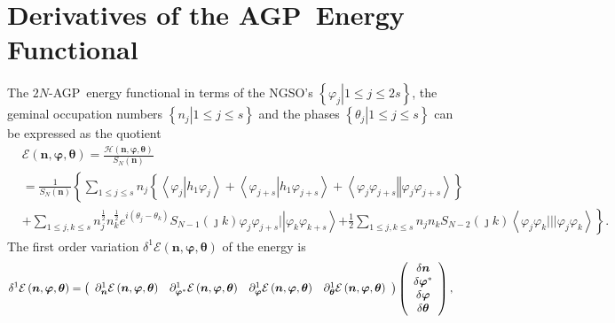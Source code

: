 \documentclass[aps,preprint]{revtex4}%
\begin{document}
\section{Derivatives of the AGP\ Energy Functional\label{variational}}

The $2N$-AGP\ energy functional in terms of the NGSO's $\left\{  \left.
\varphi_{j}\right\vert 1\leq j\leq2s\right\}  $, the geminal occupation
numbers $\left\{  \left.  n_{j}\right\vert 1\leq j\leq s\right\}  $ and the
phases $\left\{  \left.  \theta_{j}\right\vert 1\leq j\leq s\right\}  $ can be
expressed as the quotient%
\begin{align}
&  \mathcal{E}\left(  \bm{n},\bm{\varphi},\bm{\theta}\right)  =\frac
{\mathcal{H}\left(  \bm{n},\bm{\varphi},\bm{\theta}\right)  }{S_{N}\left(
\bm{n}\right)  }\nonumber\\
&  =\frac{1}{S_{N}\left(  \bm{n}\right)  }\left\{  \sum_{1\leq j\leq s}%
n_{j}\left\{  \left\langle \varphi_{j}\left\vert h_{1}\varphi_{j}\right.
\right\rangle +\left\langle \varphi_{j+s}\left\vert h_{1}\varphi_{j+s}\right.
\right\rangle +\left\langle \varphi_{j}\varphi_{j+s}\left\Vert \varphi
_{j}\varphi_{j+s}\right.  \right\rangle \right\}  \right. \nonumber\\
&  +\sum_{1\leq j,k\leq s}n_{j}^{\frac{1}{2}}n_{k}^{\frac{1}{2}}e^{i\left(
\theta_{j}-\theta_{k}\right)  }S_{N-1}\left(  \jmath k\right)  \varphi
_{j}\varphi_{j+s}|\left\vert \varphi_{k}\varphi_{k+s}\right\rangle \left.
+\frac{1}{2}\sum_{1\leq j,k\leq s}n_{j}n_{k}S_{N-2}\left(  \jmath k\right)
\left\langle \varphi_{j}\varphi_{k}|||\varphi_{j}\varphi_{k}\right\rangle
\right\}  .
\end{align}
The first order variation $\delta^{1}\mathcal{E}\left(
\bm{n},\bm{\varphi},\bm{\theta}\right)  $ of the energy is
\begin{equation}
\delta^{1}\mathcal{E}\left(  \bm{n},\bm{\varphi},\bm{\theta }\right)  =\left(
%
\begin{array}
[c]{cccc}%
\partial_{\bm{n}}^{1}\mathcal{E}\left(
\bm{n},\bm{\varphi },\bm{\theta}\right)  & \partial_{\bm{\varphi}^{\ast}}%
^{1}\mathcal{E}\left(  \bm{n},\bm{\varphi},\bm{\theta}\right)  &
\partial_{\bm{\varphi}}^{1}\mathcal{E}\left(
\bm{n},\bm{\varphi },\bm{\theta}\right)  & \partial_{\bm{\theta}}%
^{1}\mathcal{E}\left(  \bm{n},\bm{\varphi},\bm{\theta}\right)
\end{array}
\right)  \left(
\begin{array}
[c]{c}%
\delta\bm{n}\\
\delta\bm{\varphi}^{\ast}\\
\delta\bm{\varphi}\\
\delta\bm{\theta}
\end{array}
\right)  ,
\end{equation}
\end{document}
